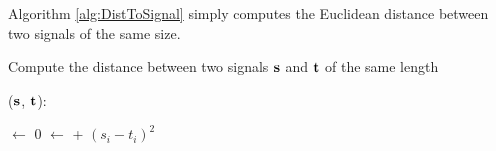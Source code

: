 Algorithm \ref{alg:DistToSignal} simply computes the Euclidean distance between
two signals of the same size.
\begin{algorithm}
\caption{Compute the distance between two signals $\mathbf s$ and $\mathbf t$ of the same
    length}
\label{alg:DistToSignal}
($\mathbf s$, $\mathbf t$):
\begin{algorithmic}[1]
\STATE {} $\leftarrow$ 0
  \STATE {} $\leftarrow$  + $(s_i - t_i)^2$
\ENDFOR
\RETURN {}
\end{algorithmic}
\end{algorithm}
